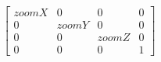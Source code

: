 $$
\begin{bmatrix}
  zoomX & 0 & 0 & 0 \\
  0 & zoomY & 0 & 0 \\
  0 & 0 & zoomZ & 0 \\
  0 & 0 & 0 & 1
\end{bmatrix}
$$